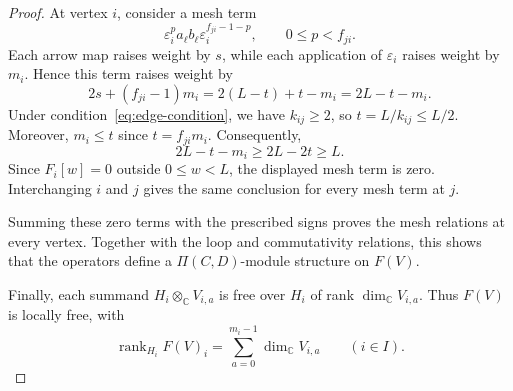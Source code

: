 \documentclass[12pt,reqno]{amsart}
\numberwithin{equation}{section}
\theoremstyle{definition}
\theoremstyle{remark}
\newcommand{\rank}{\operatorname{rank}}
\theoremstyle{plain}
\theoremstyle{plain}
\begin{document}
\begin{proof}
At vertex $i$, consider a mesh term
\[
    \varepsilon_i^p a_\ell b_\ell
    \varepsilon_i^{f_{ji}-1-p},
    \qquad 0\le p<f_{ji}.
\]
Each arrow map raises weight by $s$, while each application of $\varepsilon_i$ raises
weight by $m_i$. Hence this term raises weight by
\[
    2s+(f_{ji}-1)m_i
    =
    2(L-t)+t-m_i
    =
    2L-t-m_i.
\]
Under condition~\eqref{eq:edge-condition}, we have $k_{ij}\ge2$, so $t=L/k_{ij}\le L/2$. Moreover, $m_i\le t$ since $t=f_{ji}m_i$. Consequently,
\[
    2L-t-m_i\ge 2L-2t\ge L.
\]
Since $F_i[w]=0$ outside $0\le w<L$, the displayed mesh term is zero. Interchanging $i$ and $j$ gives the same conclusion for every mesh term at $j$.

Summing these zero terms with the prescribed signs proves the mesh relations at every vertex. Together with the loop and commutativity relations, this shows that the operators define a $\Pi(C,D)$-module structure on $F(V)$.

Finally, each summand $H_i\otimes_{\mathbb C}V_{i,a}$ is free over $H_i$ of rank $\dim_{\mathbb C}V_{i,a}$. Thus $F(V)$ is locally free, with
\[
    \rank_{H_i}F(V)_i
    =
    \sum_{a=0}^{m_i-1}\dim_{\mathbb C}V_{i,a}
    \qquad(i\in I).
\]
\end{proof}
\end{document}
